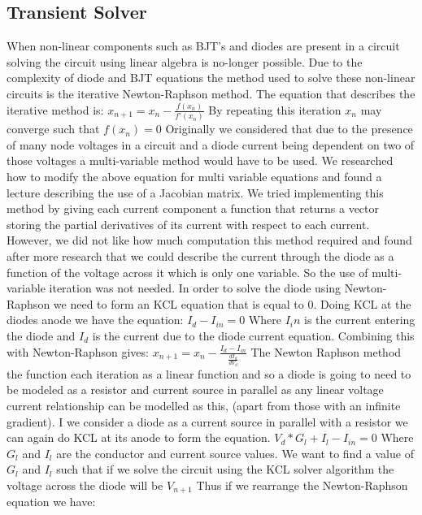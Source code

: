 \documentclass{article}
\begin{document}
\subsection{Transient Solver}
When non-linear components such as BJT's and diodes are present in a circuit solving the circuit using linear algebra is no-longer possible. Due to the complexity of diode and BJT equations the method used to solve these non-linear circuits is the iterative Newton-Raphson method. The equation that describes the iterative method is:
\bigbreak $x_{n+1} = x_n - \frac{f(x_n)}{f'(x_n)}$\bigbreak
By repeating this iteration $x_n$ may converge such that $f(x_n) = 0$
Originally we considered that due to the presence of many node voltages in a circuit and a diode current being dependent on two of those voltages a multi-variable method would have to be used. We researched how to modify the above equation for multi variable equations and found a lecture\cite{mulitvariableNR} describing the use of a Jacobian matrix. We tried implementing this method by giving each current component a function that returns a vector storing the partial derivatives of its current with respect to each current. However, we did not like how much computation this method required and found after more research that we could describe the current through the diode as a function of the voltage across it which is only one variable\cite{LinearCompanionModels}. So the use of multi-variable iteration was not needed. In order to solve the diode using Newton-Raphson we need to form an KCL equation that is equal to 0. Doing KCL at the diodes anode we have the equation:
\bigbreak $I_d - I_{in} = 0$\bigbreak
Where $I_in$ is the current entering the diode and $I_d$ is the current due to the diode current equation. Combining this with Newton-Raphson gives:
\bigbreak $x_{n+1} = x_n - \frac{I_d - I_{in}}{\frac{d I_d}{d V_d}}$\bigbreak
The Newton Raphson method the function each iteration as a linear function and so a diode is going to need to be modeled as a resistor and current source in parallel as any linear voltage current relationship can be modelled as this, (apart from those with an infinite gradient). I we consider a diode as a current source in parallel with a resistor we can again do KCL at its anode to form the equation. 
\bigbreak $V_d*G_l + I_l - I_{in} = 0$ Where $G_l$ and $I_l$ are the conductor and current source values.\bigbreak
We want to find a value of $G_l$ and $I_l$ such that if we solve the circuit using the KCL solver algorithm the voltage across the diode will be $V_{n+1}$
\bigbreak
Thus if we rearrange the Newton-Raphson equation we have:\bigbreak
\end{document}
